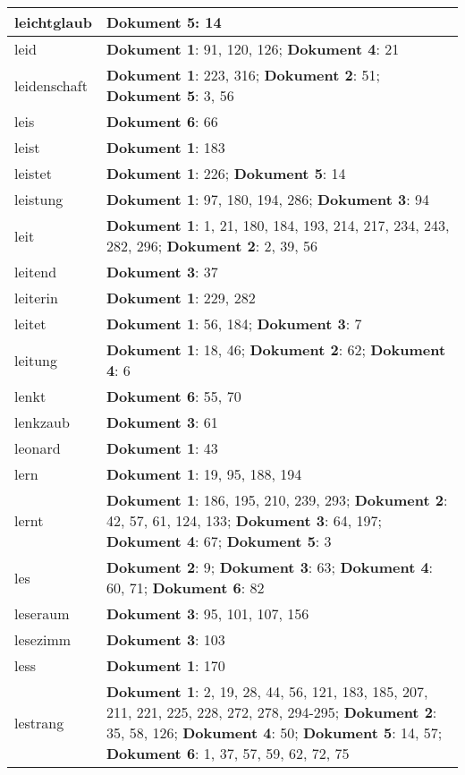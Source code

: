\documentclass[a5paper]{article}
\begin{document}
\begin{longtable}[l]{|l|p{3in}|}
\hline
leichtglaub & \textbf{Dokument 5}: 14 \\
\hline
leid & \textbf{Dokument 1}: 91, 120, 126; \textbf{Dokument 4}: 21 \\
\hline
leidenschaft & \textbf{Dokument 1}: 223, 316; \textbf{Dokument 2}: 51; \textbf{Dokument 5}: 3, 56 \\
\hline
leis & \textbf{Dokument 6}: 66 \\
\hline
leist & \textbf{Dokument 1}: 183 \\
\hline
leistet & \textbf{Dokument 1}: 226; \textbf{Dokument 5}: 14 \\
\hline
leistung & \textbf{Dokument 1}: 97, 180, 194, 286; \textbf{Dokument 3}: 94 \\
\hline
leit & \textbf{Dokument 1}: 1, 21, 180, 184, 193, 214, 217, 234, 243, 282, 296; \textbf{Dokument 2}: 2, 39, 56 \\
\hline
leitend & \textbf{Dokument 3}: 37 \\
\hline
leiterin & \textbf{Dokument 1}: 229, 282 \\
\hline
leitet & \textbf{Dokument 1}: 56, 184; \textbf{Dokument 3}: 7 \\
\hline
leitung & \textbf{Dokument 1}: 18, 46; \textbf{Dokument 2}: 62; \textbf{Dokument 4}: 6 \\
\hline
lenkt & \textbf{Dokument 6}: 55, 70 \\
\hline
lenkzaub & \textbf{Dokument 3}: 61 \\
\hline
leonard & \textbf{Dokument 1}: 43 \\
\hline
lern & \textbf{Dokument 1}: 19, 95, 188, 194 \\
\hline
lernt & \textbf{Dokument 1}: 186, 195, 210, 239, 293; \textbf{Dokument 2}: 42, 57, 61, 124, 133; \textbf{Dokument 3}: 64, 197; \textbf{Dokument 4}: 67; \textbf{Dokument 5}: 3 \\
\hline
les & \textbf{Dokument 2}: 9; \textbf{Dokument 3}: 63; \textbf{Dokument 4}: 60, 71; \textbf{Dokument 6}: 82 \\
\hline
leseraum & \textbf{Dokument 3}: 95, 101, 107, 156 \\
\hline
lesezimm & \textbf{Dokument 3}: 103 \\
\hline
less & \textbf{Dokument 1}: 170 \\
\hline
lestrang & \textbf{Dokument 1}: 2, 19, 28, 44, 56, 121, 183, 185, 207, 211, 221, 225, 228, 272, 278, 294-295; \textbf{Dokument 2}: 35, 58, 126; \textbf{Dokument 4}: 50; \textbf{Dokument 5}: 14, 57; \textbf{Dokument 6}: 1, 37, 57, 59, 62, 72, 75 \\

\end{longtable}
\end{document}
